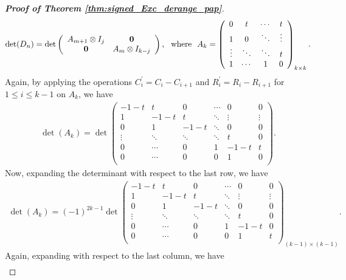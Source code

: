 \documentclass[12pt]{article}
\begin{document}
\begin{proof}[\textbf{Proof of Theorem \ref{thm:signed_Exc_derange_pap}}]
 \begin{align*}
\det(D_n)= \det\left(
 	\begin{array}{cc}
 	A_{m+1}\otimes I_j & \bf{0}\\
     \bf{0} &  {A_{m}}\otimes I_{k-j}  
 	\end{array}
 	\right),~~\text{where}~~
  A_k= \left(
 	\begin{array}{cccc}
 	0 & t &  \cdots & t \\
 	1 & 0 &  \ddots & \vdots \\
 	\vdots & \ddots & \ddots & t \\
 	1 & \cdots & 1 & 0 \\
 	\end{array}
 	\right)_{k\times k}.
\end{align*}
Again, by applying the operations $C_i^\prime=C_i-C_{i+1}$ and $R_i^\prime=R_i-R_{i+1}$ for $1\leq i\leq k-1$ on $A_k$, we have 
\begin{align*}
 \det(A_k)=\det \left(
 	\begin{array}{cccccc}
 	-1-t & t & 0 &  \cdots & 0 & 0 \\
 	1 & -1-t & t & \ddots & \vdots & \vdots \\
 	0 & 1 & -1-t &  \ddots & 0 & 0 \\
 	\vdots & \ddots & \ddots & \ddots & t & 0\\
        0 & \cdots & 0 & 1 & -1-t & t \\
 	0 & \cdots & 0 & 0 & 1 & 0 \\
 	\end{array}
 	\right)  .
\end{align*}
Now, expanding the determinant with respect to the last row, we have 
\begin{align*}
 \det(A_k)=(-1)^{2k-1}\det \left(
 	\begin{array}{cccccc}
 	-1-t & t & 0 &  \cdots & 0 & 0 \\
 	1 & -1-t & t & \ddots & \vdots & \vdots \\
 	0 & 1 & -1-t &  \ddots & 0 & 0 \\
 	\vdots & \ddots & \ddots & \ddots & t & 0\\
        0 & \cdots & 0 & 1 & -1-t & 0 \\
 	0 & \cdots & 0 & 0 & 1 & t \\
 	\end{array}
 	\right)_{(k-1)\times (k-1)}.   
\end{align*}
Again, expanding with respect to the last column, we have
\begin{align*}

\end{align*}
\end{proof}
\end{document}
